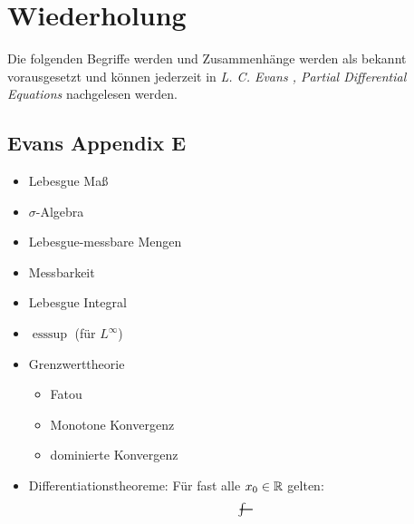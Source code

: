 \section{Wiederholung}
Die folgenden Begriffe werden und Zusammenhänge werden als bekannt
vorausgesetzt und können jederzeit in \textit{L. C. Evans , Partial
Differential Equations} nachgelesen werden.
\enter
\subsection{Evans Appendix E}
\begin{itemize}
	\item Lebesgue Maß
\item $\sigma$-Algebra
\item Lebesgue-messbare Mengen
\item Messbarkeit
\item Lebesgue Integral
\item $\text{ess}\sup$ (für $L^\infty$)
\item Grenzwerttheorie
\begin{itemize}
\item Fatou
\item Monotone Konvergenz
\item dominierte Konvergenz
\end{itemize}
\item Differentiationstheoreme:\enter
Für fast alle $x_0 \in \mathbb{R}$ gelten:
\[\avint\]
\end{itemize}
